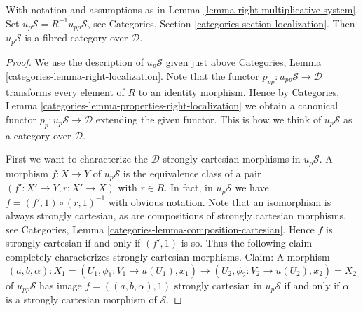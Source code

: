 %
\begin{lemma}
\label{lemma-fibred-category-pullback}
With notation and assumptions as in
Lemma \ref{lemma-right-multiplicative-system}.
Set $u_p\mathcal{S} = R^{-1}u_{pp}\mathcal{S}$, see
Categories, Section \ref{categories-section-localization}.
Then $u_p\mathcal{S}$ is a fibred category over $\mathcal{D}$.
\end{lemma}

\begin{proof}
We use the description of $u_p\mathcal{S}$ given just above
Categories, Lemma \ref{categories-lemma-right-localization}.
Note that the functor $p_{pp} : u_{pp}\mathcal{S} \to \mathcal{D}$
transforms every element of $R$ to an identity morphism.
Hence by
Categories, Lemma \ref{categories-lemma-properties-right-localization}
we obtain a canonical functor $p_p : u_p\mathcal{S} \to \mathcal{D}$
extending the given functor. This is how we think of
$u_p\mathcal{S}$ as a category over $\mathcal{D}$.

\medskip\noindent
First we want to characterize the $\mathcal{D}$-strongly cartesian morphisms
in $u_p\mathcal{S}$.
A morphism $f : X \to Y$ of $u_p\mathcal{S}$ is the equivalence class of
a pair $(f' : X' \to Y, r : X' \to X)$ with $r \in R$.
In fact, in $u_p\mathcal{S}$ we have $f = (f', 1) \circ (r, 1)^{-1}$
with obvious notation.
Note that an isomorphism is always strongly cartesian, as are
compositions of strongly cartesian morphisms, see
Categories, Lemma \ref{categories-lemma-composition-cartesian}.
Hence $f$ is strongly cartesian if and only if $(f', 1)$ is so.
Thus the following claim completely characterizes strongly cartesian
morphisms. Claim: A morphism
$$
(a, b, \alpha) :
X_1 = (U_1, \phi_1 : V_1 \to u(U_1), x_1)
\longrightarrow
(U_2, \phi_2 : V_2 \to u(U_2), x_2) = X_2
$$
of $u_{pp}\mathcal{S}$ has image $f = ((a, b, \alpha), 1)$
strongly cartesian in $u_p\mathcal{S}$ if and only if $\alpha$
is a strongly cartesian morphism of $\mathcal{S}$.


\end{proof}
